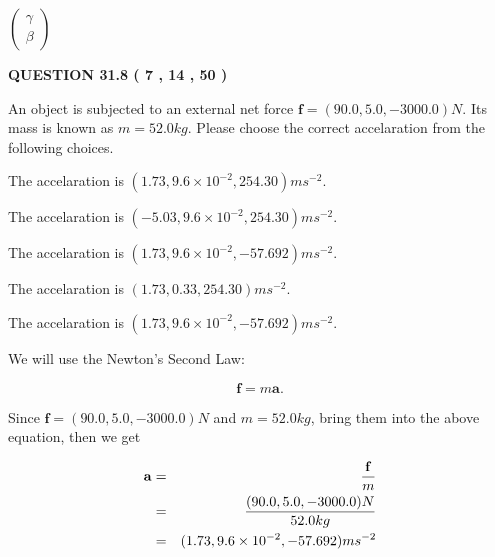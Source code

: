 \documentclass[12pt]{article}
\begin{document}
   
 $  \left( \begin{array}
 {
 c
 }
 \gamma \\ 
 \beta
 \end{array} \right) $ 
  
\vspace{0.2in}
  
{\textbf{\Large{QUESTION
31.8 
 (           7 ,          14 ,          50 )
}}}
  
  
 
An object is subjected to an external net force $\mathbf{f}=
(90.0 , 5.0 , -3000.0) N$.
Its mass is known as $m= %
52.0 kg$.
Please choose the correct accelaration from the following choices.
 
 
  The accelaration is $  %
(
1.73,
9.6 \times 10^{-2},
254.30)
ms^{-2} $.
 
 
  The accelaration is $  %
(
-5.03,
9.6 \times 10^{-2},
254.30)
ms^{-2} $.
 
 
  The accelaration is $  %
(
1.73,
9.6 \times 10^{-2},
-57.692)
ms^{-2} $.
 
 
  The accelaration is $  %
(
1.73,
0.33,
254.30)
ms^{-2} $.
 
 
\noindent{}
 
 
  The accelaration is $  %
(
1.73,
9.6 \times 10^{-2},
-57.692)
ms^{-2} $.
 
 
\noindent{}
 
 
 
 
 
\noindent{}
 
 

We will use the Newton's Second Law:
 
\[
\mathbf{f}=m\mathbf{a}.
\]
 
Since $\mathbf{f}= %
(90.0 , 5.0 , -3000.0) N$
and $m= %
52.0kg$, bring them into the above equation, then we get
 
\begin{eqnarray*}
\mathbf{a}&=&\frac{\mathbf{f}}m  \\
&=&\frac{ %
(90.0 , 5.0 , -3000.0) N}{ %
52.0kg}  \\
&=& %
(1.73 , 9.6 \times 10^{-2} , -57.692) ms^{-2}
\end{eqnarray*}
 
\end{document}
